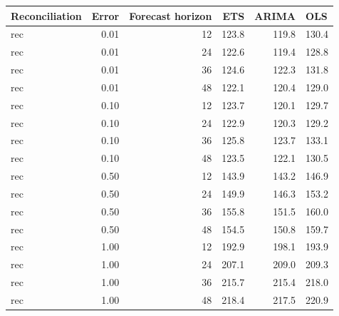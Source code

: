 \documentclass[11pt,a4paper,]{article}
\let\origtable\table
\let\endorigtable\endtable
\renewenvironment{table}[1][2] {
    \expandafter\origtable\expandafter[!htbp]
} {
    \endorigtable
}
\begin{document}
\begin{table}[!h]

\caption{\label{tab:TourismdatasimrollingnoiseFH}Mean RMSE of rolling origin forecasts for simulated data (304 bottom-level series and 8 levels of hierarchy), for different error levels,  methods (ETS, ARIMA, OLS), forecast horizons, with reconciliation.}
\centering
\begin{tabular}[t]{lrrrrl}
\toprule
Reconciliation & Error & Forecast horizon & ETS & ARIMA & OLS\\
\midrule
rec & 0.01 & 12 & 123.8 & 119.8 & 130.4\\
rec & 0.01 & 24 & 122.6 & 119.4 & 128.8\\
rec & 0.01 & 36 & 124.6 & 122.3 & 131.8\\
rec & 0.01 & 48 & 122.1 & 120.4 & 129.0\\
rec & 0.10 & 12 & 123.7 & 120.1 & 129.7\\
rec & 0.10 & 24 & 122.9 & 120.3 & 129.2\\
rec & 0.10 & 36 & 125.8 & 123.7 & 133.1\\
rec & 0.10 & 48 & 123.5 & 122.1 & 130.5\\
rec & 0.50 & 12 & 143.9 & 143.2 & 146.9\\
rec & 0.50 & 24 & 149.9 & 146.3 & 153.2\\
rec & 0.50 & 36 & 155.8 & 151.5 & 160.0\\
rec & 0.50 & 48 & 154.5 & 150.8 & 159.7\\
rec & 1.00 & 12 & 192.9 & 198.1 & 193.9\\
rec & 1.00 & 24 & 207.1 & 209.0 & 209.3\\
rec & 1.00 & 36 & 215.7 & 215.4 & 218.0\\
rec & 1.00 & 48 & 218.4 & 217.5 & 220.9\\
\bottomrule
\end{tabular}
\end{table}
\end{document}
